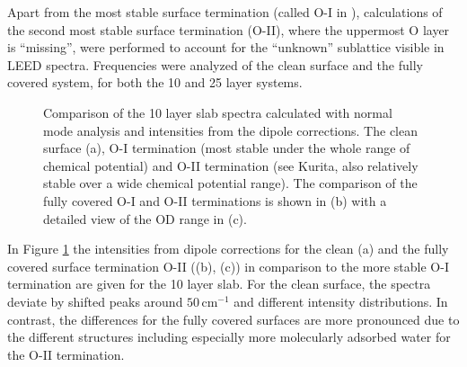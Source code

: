 \documentclass[11pt,DIV=13,BCOR=5mm,a4paper,headinclude]{scrbook}
\begin{document}
Apart from the most stable surface termination (called O-I in \cite{kuri10}), calculations of the second most stable surface termination (O-II), where the uppermost O layer is ``missing'', were performed to account for the ``unknown'' sublattice visible in LEED spectra.
Frequencies were analyzed of the clean surface and the fully covered system, for both the 10 and 25 layer systems.
\begin{figure}[!h]
 \centering
 \quad
 \quad
 \caption{Comparison of the 10 layer slab spectra calculated with normal mode analysis and intensities from the dipole corrections.
The clean surface (a), O-I termination (most stable under the whole range of chemical potential) and O-II termination (see Kurita\cite{kuri10}, also relatively stable over a wide chemical potential range).
The comparison of the fully covered O-I and O-II terminations is shown in (b) with a detailed view of the OD range in (c).}
 \label{abb:comp_O-I-O-II}
\end{figure}
In Figure \ref{abb:comp_O-I-O-II} the intensities from dipole corrections for the clean (a) and the fully covered surface termination O-II ((b), (c)) in comparison to the more stable O-I termination are given for the 10 layer slab.
For the clean surface, the spectra deviate by shifted peaks around $50\,$cm$^{-1}$ and different intensity distributions.
In contrast, the differences for the fully covered surfaces are more pronounced due to the different structures including especially more molecularly adsorbed water for the O-II termination.
\end{document}
